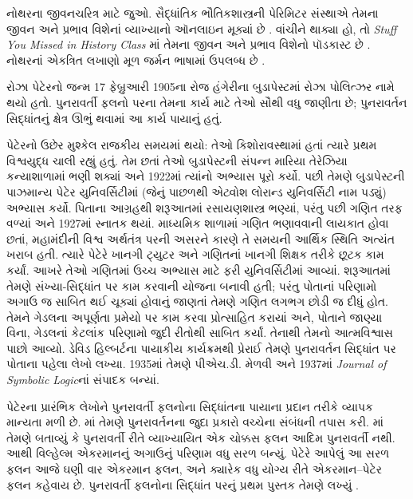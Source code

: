 \begin{reading} 
નોથરના જીવનચરિત્ર માટે
\citet{Dick1981} જુઓ. સૈદ્ધાંતિક
ભૌતિકશાસ્ત્રની પેરિમિટર
સંસ્થાએ તેમના જીવન અને
પ્રભાવ વિશેનાં વ્યાખ્યાનો
ઑનલાઇન મૂક્યાં છે
\citep{Perimeter2015}. વાંચીને
થાક્યા હો, તો
\emph{Stuff You Missed in History Class}
માં તેમના જીવન અને પ્રભાવ
વિશેનો પૉડકાસ્ટ છે
\citep{Frey2015}. નોથરનાં
એકત્રિત લખાણો મૂળ જર્મન
ભાષામાં ઉપલબ્ધ છે
\citep{Noether1983}.
\end{reading}
\endgroup


\begingroup
\makeatletter{}\makeatother


\label{guunit:OLP-0627}


 
રોઝા પેટેરનો જન્મ 17 ફેબ્રુઆરી 1905ના
રોજ હંગેરીના બુડાપેસ્ટમાં રોઝા પોલિત્ઝર
નામે થયો હતો. પુનરાવર્તી ફલનો પરના
તેમના કાર્ય માટે તેઓ સૌથી વધુ જાણીતા
છે; પુનરાવર્તન સિદ્ધાંતનું ક્ષેત્ર ઊભું
થવામાં આ કાર્ય પાયાનું હતું.

પેટેરનો ઉછેર મુશ્કેલ રાજકીય સમયમાં
થયો: તેઓ કિશોરાવસ્થામાં હતાં ત્યારે
પ્રથમ વિશ્વયુદ્ધ ચાલી રહ્યું હતું.
તેમ છતાં તેઓ બુડાપેસ્ટની સંપન્ન
મારિયા તેરેઝિયા કન્યાશાળામાં ભણી
શક્યાં અને 1922માં ત્યાંનો અભ્યાસ
પૂરો કર્યો. પછી તેમણે બુડાપેસ્ટની
પાઝમાન્ય પેટેર યુનિવર્સિટીમાં
(જેનું પાછળથી એટ્વોશ લોરાન્ડ
યુનિવર્સિટી નામ પડ્યું) અભ્યાસ
કર્યો. પિતાના આગ્રહથી શરૂઆતમાં
રસાયણશાસ્ત્ર ભણ્યાં, પરંતુ પછી
ગણિત તરફ વળ્યાં અને 1927માં
સ્નાતક થયાં. માધ્યમિક શાળામાં
ગણિત ભણાવવાની લાયકાત હોવા
છતાં, મહામંદીની વિશ્વ અર્થતંત્ર
પરની અસરને કારણે તે સમયની
આર્થિક સ્થિતિ અત્યંત ખરાબ હતી.
ત્યારે પેટેરે ખાનગી ટ્યુટર અને
ગણિતનાં ખાનગી શિક્ષક તરીકે
છૂટક કામ કર્યાં. આખરે તેઓ
ગણિતમાં ઉચ્ચ અભ્યાસ માટે
ફરી યુનિવર્સિટીમાં આવ્યાં.
શરૂઆતમાં તેમણે સંખ્યા-સિદ્ધાંત
પર કામ કરવાની યોજના બનાવી
હતી; પરંતુ પોતાનાં પરિણામો
અગાઉ જ સાબિત થઈ ચૂક્યાં
હોવાનું જાણતાં તેમણે ગણિત
લગભગ છોડી જ દીધું હોત.
તેમને ગેડલના અપૂર્ણતા
પ્રમેયો પર કામ કરવા પ્રોત્સાહિત
કરાયાં અને, પોતાને જાણ્યા
વિના, ગેડલનાં કેટલાંક પરિણામો
જુદી રીતોથી સાબિત કર્યાં.
તેનાથી તેમનો આત્મવિશ્વાસ
પાછો આવ્યો. ડેવિડ હિલ્બર્ટના
પાયાકીય કાર્યક્રમથી પ્રેરાઈ
તેમણે પુનરાવર્તન સિદ્ધાંત પર
પોતાના પહેલા લેખો લખ્યા.
1935માં તેમણે પીએચ.ડી. મેળવી
અને 1937માં \emph{Journal of
  Symbolic Logic}નાં સંપાદક બન્યાં.

પેટેરના પ્રારંભિક લેખોને
પુનરાવર્તી ફલનોના સિદ્ધાંતના
પાયાના પ્રદાન તરીકે વ્યાપક
માન્યતા મળી છે.
\cite{Peter1935a}માં તેમણે
પુનરાવર્તનના જુદા પ્રકારો
વચ્ચેના સંબંધની તપાસ કરી.
\cite{Peter1935b}માં તેમણે
બતાવ્યું કે પુનરાવર્તી રીતે
વ્યાખ્યાયિત એક ચોક્કસ ફલન
આદિમ પુનરાવર્તી નથી. આથી
વિલ્હેલ્મ એકરમાનનું અગાઉનું
પરિણામ વધુ સરળ બન્યું.
પેટેરે આપેલું આ સરળ ફલન
આજે ઘણી વાર એકરમાન ફલન,
અને ક્યારેક વધુ યોગ્ય રીતે
એકરમાન--પેટેર ફલન કહેવાય
છે. પુનરાવર્તી ફલનોના
સિદ્ધાંત પરનું પ્રથમ પુસ્તક
તેમણે લખ્યું \citep{Peter1951}.

